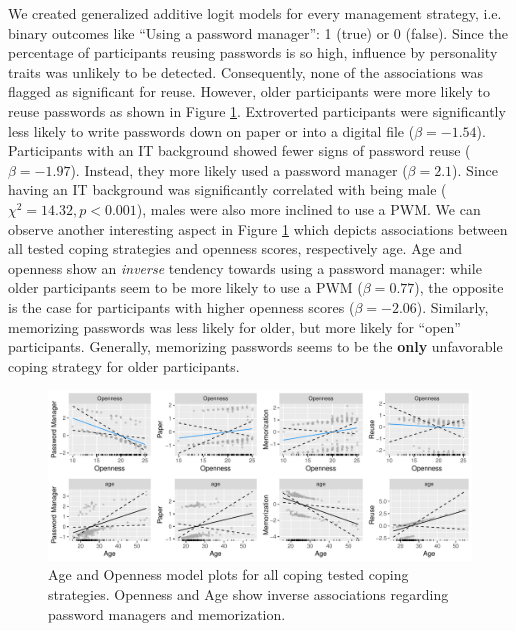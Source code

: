 We created generalized additive logit models for every management strategy, i.e. binary outcomes like ``Using a password manager'': 1 (true) or 0 (false). Since the percentage of participants reusing passwords is so high, influence by personality traits was unlikely to be detected. Consequently, none of the associations was flagged as significant for reuse. However, older participants were more likely to reuse passwords as shown in Figure \ref{fig:personality:study3:age-openness-coping-all}. Extroverted participants were significantly less likely to write passwords down on paper or into a digital file ($\beta=-1.54$). Participants with an IT background showed fewer signs of password reuse ($\beta=-1.97$). Instead, they more likely used a password manager ($\beta=2.1$). Since having an IT background was significantly correlated with being male ($\chi^2=14.32, p < 0.001$), males were also more inclined to use a \gls{PWM}. We can observe another interesting aspect in Figure \ref{fig:personality:study3:age-openness-coping-all} which depicts associations between all tested coping strategies and openness scores, respectively age. Age and openness show an \textit{inverse} tendency towards using a password manager: while older participants seem to be more likely to use a \gls{PWM} ($\beta=0.77$), the opposite is the case for participants with higher openness scores ($\beta=-2.06$). Similarly, memorizing passwords was less likely for older, but more likely for ``open'' participants. Generally, memorizing passwords seems to be the \textbf{only} unfavorable coping strategy for older participants. 
\begin{figure}[tbph]
	\centering
	\includegraphics[width=1\linewidth]{figures/personality/age-openness-coping-all}
	\caption{\label{fig:personality:study3:age-openness-coping-all}Age and Openness model plots for all coping tested coping strategies. Openness and Age show inverse associations regarding password managers and memorization.}
\end{figure}

